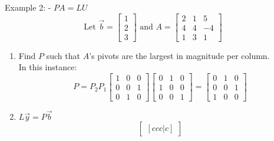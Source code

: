 \documentclass[10pt]{article}
\begin{document}
\begin{multicols}{2}
\begin{minipage}{0.95\columnwidth}
        Example 2: - \(PA = LU\)
        \begin{equation*}
            \text{Let } \overrightarrow{b} = \begin{bmatrix}
                1 \\
                2 \\
                3
            \end{bmatrix}
            \text{ and } A = \begin{bmatrix}
                2 & 1 & 5  \\
                4 & 4 & -4 \\
                1 & 3 & 1
            \end{bmatrix}
        \end{equation*}
        \begin{enumerate}
            \item Find \(P\) such that \(A\)'s pivots are the largest in magnitude per column. \\
                  \footnotesize In this instance:
                  \begin{equation*}
                      P = P_2 P_1
                      \begin{bmatrix}
                          1 & 0 & 0 \\
                          0 & 0 & 1 \\
                          0 & 1 & 0
                      \end{bmatrix}
                      \begin{bmatrix}
                          0 & 1 & 0 \\
                          1 & 0 & 0 \\
                          0 & 0 & 1
                      \end{bmatrix}
                      = \begin{bmatrix}
                          0 & 1 & 0 \\
                          0 & 0 & 1 \\
                          1 & 0 & 0
                      \end{bmatrix}
                  \end{equation*}
                  \normalsize
            \item \(L \overrightarrow{y} = P\overrightarrow{b}\)
                  \begin{equation*}
                      \begin{bmatrix}[ccc|c]

\end{bmatrix}
\end{equation*}
\end{enumerate}
\end{minipage}
\end{multicols}
\end{document}

